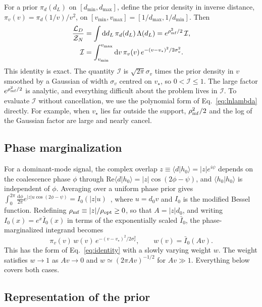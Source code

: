 \documentclass[prd,twocolumn,nofootinbib,superscriptaddress,amsmath,amssymb]{revtex4-2}
\newcommand{\dd}{\mathrm{d}}
\newcommand{\rhomf}{\rho_{\rm mf}}
\newcommand{\rhoopt}{\rho_{\rm opt}}
\newcommand{\dref}{d_0}
\newcommand{\vs}{v_\star}
\newcommand{\vmin}{v_{\min}}
\newcommand{\vmax}{v_{\max}}
\newcommand{\dmin}{d_{\min}}
\newcommand{\dmax}{d_{\max}}
\newcommand{\Lam}{\Lambda}
\newcommand{\Ibar}{\bar{I}}
\begin{document}
For a prior $\pi_d(d_L)$ on $[\dmin,\dmax]$,
define the prior density in inverse distance,
$\pi_v(v) = \pi_d(1/v)/v^2$,
on $[\vmin,\vmax]=[1/\dmax,1/\dmin]$.
Then
\begin{align}
\frac{\mathcal{L}_D}{\mathcal{Z}_N} &= \int \dd d_L\,\pi_d(d_L)\,\Lam(d_L) = e^{\rhomf^2/2}\,\mathcal{I},
\label{eq:identity}\\
\mathcal{I} &= \int_{\vmin}^{\vmax}\dd v\,\pi_v(v)\,e^{-(v-\vs)^2/2\sigma_v^2}.
\nonumber
\end{align}
This identity is exact.
The quantity $\mathcal{I}$ is $\sqrt{2\pi}\sigma_v$ times the prior density in $v$ smoothed by a Gaussian of width $\sigma_v$ centred on $\vs$,
so $0<\mathcal{I}\le1$.
The large factor $e^{\rhomf^2/2}$ is analytic,
and everything difficult about the problem lives in $\mathcal{I}$.
To evaluate $\mathcal{I}$ without cancellation,
we use the polynomial form of Eq.~\eqref{eq:lnlambda} directly.
For example,
when $\vs$ lies far outside the support,
$\rhomf^2/2$ and the log of the Gaussian factor are large and nearly cancel.

\subsection{Phase marginalization}

For a dominant-mode signal,
the complex overlap $z\equiv\langle d|h_0\rangle = |z|e^{i\psi}$ depends on the coalescence phase $\phi$ through $\mathrm{Re}\langle d|h_0\rangle = |z|\cos(2\phi-\psi)$,
and $\langle h_0|h_0\rangle$ is independent of $\phi$.
Averaging over a uniform phase prior gives $\int_0^{2\pi}\frac{\dd\phi}{2\pi}e^{|z| u\cos(2\phi-\psi)} = I_0(|z|u)$~\cite{Thrane2019},
where $u=\dref v$ and $I_0$ is the modified Bessel function.
Redefining $\rhomf\equiv|z|/\rhoopt\ge0$,
so that $A = |z|\dref$,
and writing $I_0(x)=e^{x}\Ibar_0(x)$ in terms of the exponentially scaled $\Ibar_0$,
the phase-marginalized integrand becomes
\begin{equation}
\pi_v(v)\,w(v)\,e^{-(v-\vs)^2/2\sigma_v^2},\qquad w(v)=\Ibar_0(Av).
\end{equation}
This has the form of Eq.~\eqref{eq:identity} with a slowly varying weight $w$.
The weight satisfies $w\to1$ as $Av\to0$ and $w\simeq(2\pi Av)^{-1/2}$ for $Av\gg1$.
Everything below covers both cases.

\subsection{Representation of the prior}
\end{document}
